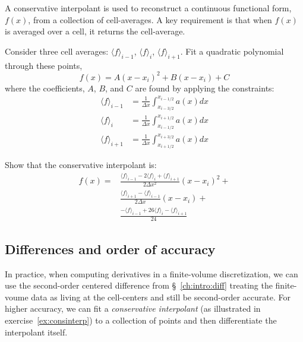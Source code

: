 \begin{exercise}
{\label{ex:consinterp} A conservative interpolant is used to reconstruct a continuous
  functional form, $f(x)$, from a collection of cell-averages.  A key
  requirement is that when $f(x)$ is averaged over a cell, it returns
  the cell-average.

Consider three cell averages: $\langle f \rangle_{i-1}$, $\langle f \rangle_{i}$, $\langle f \rangle_{i+1}$.  Fit a quadratic polynomial through these points,
 \begin{equation}
 f(x) = A (x - x_i)^2 + B (x - x_i) + C
 \end{equation}
 where the coefficients, $A$, $B$, and $C$ are found by applying the constraints:
 \begin{align}
 \langle f\rangle_{i-1} &= \frac{1}{\Delta x}
      \int_{x_{i-3/2}}^{x_{i-1/2}} a(x) dx \\
 \langle f\rangle_{i} &= \frac{1}{\Delta x}
      \int_{x_{i-1/2}}^{x_{i+1/2}} a(x) dx \\
 \langle f\rangle_{i+1} &= \frac{1}{\Delta x}
      \int_{x_{i+1/2}}^{x_{i+3/2}} a(x) dx 
 \end{align}

Show that the conservative interpolant is:
\begin{align}
f(x) = &\frac{\langle f\rangle_{i-1} - 2 \langle f\rangle_i +
             \langle f\rangle_{i+1}}{2\Delta x^2} (x-x_i)^2 + \nonumber \\
       &\frac{\langle f\rangle_{i+1} - \langle f\rangle_{i-1}}
            {2\Delta x} (x-x_i) + \nonumber \\
       &\frac{-\langle f\rangle_{i-1} + 26 \langle f\rangle_i
             -\langle f\rangle_{i+1}}{24}
\end{align}
}

\end{exercise}

\subsection{Differences and order of accuracy}

In practice, when computing derivatives in a finite-volume
discretization, we can use the second-order centered difference from
\S~\ref{ch:intro:diff} treating the finite-voume data as living at the
cell-centers and still be second-order accurate.  For higher accuracy,
we can fit a {\em conservative interpolant} (as illustrated in
exercise~\ref{ex:consinterp}) to a collection of points and then
differentiate the interpolant itself.

